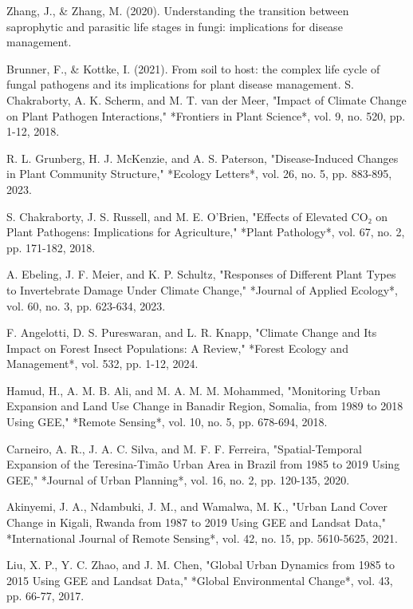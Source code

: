 \documentclass{article}
\begin{document}
\begin{thebibliography}{99}
 Zhang, J., \& Zhang, M. (2020). Understanding the transition between saprophytic and parasitic life stages in fungi: implications for disease management.

 Brunner, F., \& Kottke, I. (2021). From soil to host: the complex life cycle of fungal pathogens and its implications for plant disease management.
 S. Chakraborty, A. K. Scherm, and M. T. van der Meer, "Impact of Climate Change on Plant Pathogen Interactions," *Frontiers in Plant Science*, vol. 9, no. 520, pp. 1-12, 2018.

 R. L. Grunberg, H. J. McKenzie, and A. S. Paterson, "Disease-Induced Changes in Plant Community Structure," *Ecology Letters*, vol. 26, no. 5, pp. 883-895, 2023.

 S. Chakraborty, J. S. Russell, and M. E. O'Brien, "Effects of Elevated CO₂ on Plant Pathogens: Implications for Agriculture," *Plant Pathology*, vol. 67, no. 2, pp. 171-182, 2018.

 A. Ebeling, J. F. Meier, and K. P. Schultz, "Responses of Different Plant Types to Invertebrate Damage Under Climate Change," *Journal of Applied Ecology*, vol. 60, no. 3, pp. 623-634, 2023.

 F. Angelotti, D. S. Pureswaran, and L. R. Knapp, "Climate Change and Its Impact on Forest Insect Populations: A Review," *Forest Ecology and Management*, vol. 532, pp. 1-12, 2024.


 Hamud, H., A. M. B. Ali, and M. A. M. M. Mohammed, "Monitoring Urban Expansion and Land Use Change in Banadir Region, Somalia, from 1989 to 2018 Using GEE," *Remote Sensing*, vol. 10, no. 5, pp. 678-694, 2018.

 Carneiro, A. R., J. A. C. Silva, and M. F. F. Ferreira, "Spatial-Temporal Expansion of the Teresina-Timão Urban Area in Brazil from 1985 to 2019 Using GEE," *Journal of Urban Planning*, vol. 16, no. 2, pp. 120-135, 2020.

 Akinyemi, J. A., Ndambuki, J. M., and Wamalwa, M. K., "Urban Land Cover Change in Kigali, Rwanda from 1987 to 2019 Using GEE and Landsat Data," *International Journal of Remote Sensing*, vol. 42, no. 15, pp. 5610-5625, 2021.

 Liu, X. P., Y. C. Zhao, and J. M. Chen, "Global Urban Dynamics from 1985 to 2015 Using GEE and Landsat Data," *Global Environmental Change*, vol. 43, pp. 66-77, 2017.



\end{thebibliography}
\end{document}
